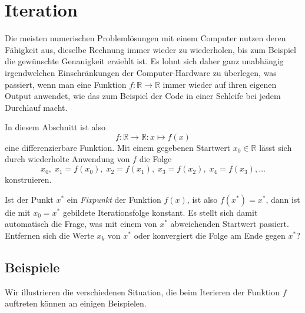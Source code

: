 %
%
%
\section{Iteration
\label{buch:section:iteration}}
Die meisten numerischen Problemlösungen mit einem Computer nutzen deren
Fähigkeit aus, dieselbe Rechnung immer wieder zu wiederholen, bis zum
Beispiel die gewünschte Genauigkeit erziehlt ist.
%
Es lohnt sich daher ganz unabhängig irgendwelchen Einschränkungen 
der Computer-Hardware zu überlegen, was passiert, wenn man eine
Funktion $f\colon \mathbb R\to\mathbb R$ immer wieder auf ihren eigenen
Output anwendet, wie das zum Beispiel der Code in einer Schleife
bei jedem Durchlauf macht.
%

In diesem Abschnitt ist also
\[
f\colon \mathbb{R}\to\mathbb{R} : x\mapsto f(x)
\]
eine differenzierbare Funktion.
%
%
Mit einem gegebenen Startwert $x_0\in\mathbb R$ lässt sich durch
wiederholte Anwendung von $f$ die Folge
\[
x_0,\; x_1 = f(x_0),\; x_2 = f(x_1),\; x_3 = f(x_2),\; x_4 = f(x_3),\dots
\]
konstruieren.
%

Ist der Punkt $x^*$ ein {\em Fixpunkt} der Funktion $f(x)$, ist also
$f(x^*)=x^*$,
%
dann ist die mit $x_0=x^*$ gebildete Iterationsfolge konstant.
Es stellt sich damit automatisch die Frage, was mit einem von $x^*$
abweichenden Startwert passiert.
Entfernen sich die Werte $x_k$ von $x^*$
oder konvergiert die Folge am Ende gegen $x^*$?
%

%
%
\subsection{Beispiele}
Wir illustrieren die verschiedenen Situation, die beim Iterieren der
Funktion $f$ auftreten können an einigen Beispielen.

